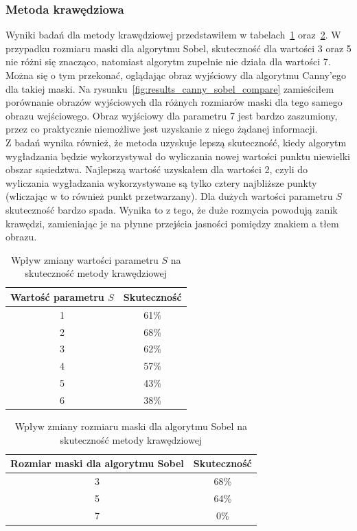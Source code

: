 \subsubsection{Metoda krawędziowa}
Wyniki badań dla metody krawędziowej przedstawiłem w tabelach~\ref{tab:metoda_krawedziowa_param_s} oraz~\ref{tab:metoda_krawedziowa_sobel}. W przypadku rozmiaru maski dla algorytmu Sobel, skuteczność dla wartości 3 oraz 5 nie różni się znacząco, natomiast algorytm zupełnie nie działa dla wartości 7. Można się o tym przekonać, oglądając obraz wyjściowy dla algorytmu Canny'ego dla takiej maski. Na rysunku~\ref{fig:results_canny_sobel_compare} zamieściłem porównanie obrazów wyjściowych dla różnych rozmiarów maski dla tego samego obrazu wejściowego. Obraz wyjściowy dla parametru 7 jest bardzo zaszumiony, przez co praktycznie niemożliwe jest uzyskanie z niego żądanej informacji.\\
Z badań wynika również, że metoda uzyskuje lepszą skuteczność, kiedy algorytm wygładzania będzie wykorzystywał do wyliczania nowej wartości punktu niewielki obszar sąsiedztwa. Najlepszą wartość uzyskałem dla wartości 2, czyli do wyliczania wygładzania wykorzystywane są tylko cztery najbliższe punkty (wliczając w to również punkt przetwarzany). Dla dużych wartości parametru $S$ skuteczność bardzo spada. Wynika to z tego, że duże rozmycia powodują zanik krawędzi, zamieniając je na płynne przejścia jasności pomiędzy znakiem a tłem obrazu.
\begin {table}
  \begin{center}
    \begin{tabular}{c | c}
      Wartość parametru $S$ & Skuteczność \\
      \hline
      1 & 61\% \\
      2 & 68\% \\
      3 & 62\% \\
      4 & 57\% \\
      5 & 43\% \\
      6 & 38\% 
    \end{tabular}
    \caption {Wpływ zmiany wartości parametru $S$ na skuteczność metody krawędziowej}
    \label{tab:metoda_krawedziowa_param_s} 
  \end{center}
\end {table}

\begin {table}
  \begin{center}
    \begin{tabular}{c | c}
      Rozmiar maski dla algorytmu Sobel & Skuteczność \\
      \hline
      3 & 68\% \\
      5 & 64\% \\
      7 & 0\% 
    \end{tabular}
    \caption {Wpływ zmiany rozmiaru maski dla algorytmu Sobel na skuteczność metody krawędziowej}
    \label{tab:metoda_krawedziowa_sobel} 
  \end{center}
\end {table}

